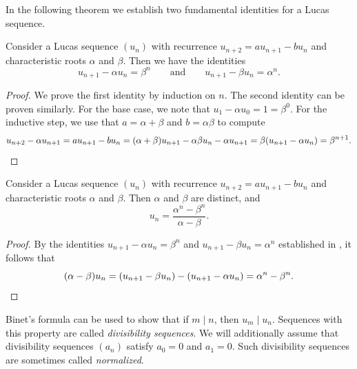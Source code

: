 In the following theorem we establish two fundamental identities for a Lucas sequence.

\begin{theorem}\label{theorem:fundamental-identities-lucas-sequence}
  Consider a Lucas sequence $(u_n)$ with recurrence $u_{n+2}=au_{n+1}-bu_n$ and characteristic roots $\alpha$ and $\beta$. Then we have the identities
  \begin{equation*}
    u_{n+1}-\alpha u_n=\beta^n\qquad\text{and}\qquad u_{n+1}-\beta u_n=\alpha^n.
  \end{equation*}
\end{theorem}

\begin{proof}
  We prove the first identity by induction on $n$. The second identity can be proven similarly. For the base case, we note that $u_1-\alpha u_0=1=\beta^0$. For the inductive step, we use that $a=\alpha+\beta$ and $b=\alpha\beta$ to compute
  \begin{equation*}
    u_{n+2}-\alpha u_{n+1}=au_{n+1}-bu_n=(\alpha+\beta)u_{n+1}-\alpha\beta u_n-\alpha u_{n+1}=\beta(u_{n+1}-\alpha u_n)=\beta^{n+1}.\qedhere
  \end{equation*}
\end{proof}

\begin{theorem}\label{theorem:binets-formula}
  Consider a Lucas sequence $(u_n)$ with recurrence $u_{n+2}=au_{n+1}-bu_n$ and characteristic roots $\alpha$ and $\beta$. Then $\alpha$ and $\beta$ are distinct, and
  \begin{equation*}
    u_n=\frac{\alpha^n-\beta^n}{\alpha-\beta}.
  \end{equation*}
\end{theorem}

\begin{proof}
  By the identities $u_{n+1}-\alpha u_n=\beta^n$ and $u_{n+1}-\beta u_n=\alpha^n$ established in , it follows that
  \begin{equation*}
    (\alpha-\beta)u_n = (u_{n+1}-\beta u_n) - (u_{n+1}-\alpha u_n) = \alpha^n-\beta^n.\qedhere
  \end{equation*}
\end{proof}

Binet's formula can be used to show that if $m\mid n$, then $u_m\mid u_n$. Sequences with this property are called \emph{divisibility sequences}. We will additionally assume that divisibility sequences $(a_n)$ satisfy $a_0=0$ and $a_1=0$. Such divisibility sequences are sometimes called \emph{normalized}.

